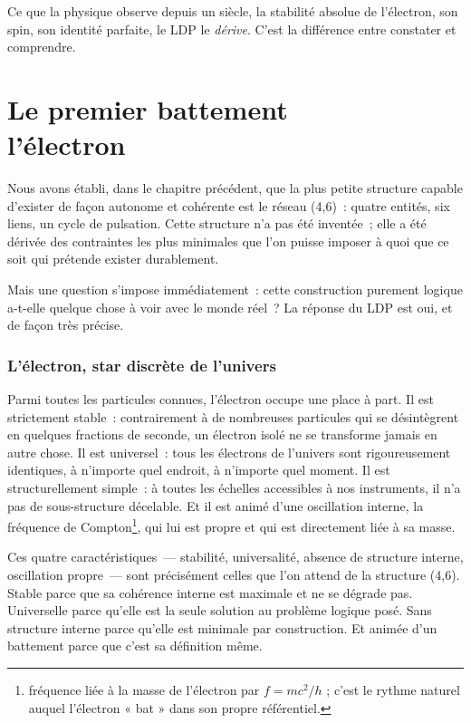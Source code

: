 \documentclass[12pt, a4paper, openright]{book}
\begin{document}
\medskip

Ce que la physique observe depuis un siècle, la stabilité absolue de l'électron, son spin, son identité parfaite, le LDP le \emph{dérive}. C'est la différence entre constater et comprendre.

\chapter[Le premier battement --- l'électron]{Le premier battement \\ l'électron}

Nous avons établi, dans le chapitre précédent, que la plus petite structure capable d'exister de façon autonome et cohérente est le réseau (4,6)~: quatre entités, six liens, un cycle de pulsation. Cette structure n'a pas été inventée~; elle a été dérivée des contraintes les plus minimales que l'on puisse imposer à quoi que ce soit qui prétende exister durablement.

\medskip

Mais une question s'impose immédiatement~: cette construction purement logique a-t-elle quelque chose à voir avec le monde réel~? La réponse du LDP est oui, et de façon très précise.

\subsection*{L'électron, star discrète de l'univers}

Parmi toutes les particules connues, l'électron occupe une place à part. Il est strictement stable~: contrairement à de nombreuses particules qui se désintègrent en quelques fractions de seconde, un électron isolé ne se transforme jamais en autre chose. Il est universel~: tous les électrons de l'univers sont rigoureusement identiques, à n'importe quel endroit, à n'importe quel moment. Il est structurellement simple~: à toutes les échelles accessibles à nos instruments, il n'a pas de sous-structure décelable. Et il est animé d'une oscillation interne, la fréquence de Compton\footnote{fréquence liée à la masse de l'électron par $f = mc^2/h$ ; c'est le rythme naturel auquel l'électron « bat » dans son propre référentiel.}, qui lui est propre et qui est directement liée à sa masse.

\medskip

Ces quatre caractéristiques~--- stabilité, universalité, absence de structure interne, oscillation propre~--- sont précisément celles que l'on attend de la structure (4,6). Stable parce que sa cohérence interne est maximale et ne se dégrade pas. Universelle parce qu'elle est la seule solution au problème logique posé. Sans structure interne parce qu'elle est minimale par construction. Et animée d'un battement parce que c'est sa définition même.
\end{document}
